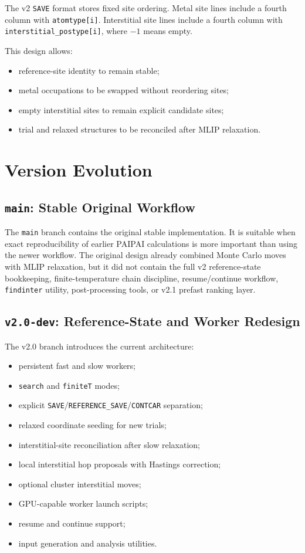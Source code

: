 \documentclass[11pt]{article}
\begin{document}
The v2 \texttt{SAVE} format stores fixed site ordering.
Metal site lines include a fourth column with \texttt{atomtype[i]}.
Interstitial site lines include a fourth column with \texttt{interstitial\_postype[i]}, where $-1$ means empty.

This design allows:

\begin{itemize}
  \item reference-site identity to remain stable;
  \item metal occupations to be swapped without reordering sites;
  \item empty interstitial sites to remain explicit candidate sites;
  \item trial and relaxed structures to be reconciled after MLIP relaxation.
\end{itemize}

\section{Version Evolution}

\subsection{\texttt{main}: Stable Original Workflow}

The \texttt{main} branch contains the original stable implementation.
It is suitable when exact reproducibility of earlier PAIPAI calculations is more important than using the newer workflow.
The original design already combined Monte Carlo moves with MLIP relaxation, but it did not contain the full v2 reference-state bookkeeping, finite-temperature chain discipline, resume/continue workflow, \texttt{findinter} utility, post-processing tools, or v2.1 prefast ranking layer.

\subsection{\texttt{v2.0-dev}: Reference-State and Worker Redesign}

The v2.0 branch introduces the current architecture:

\begin{itemize}
  \item persistent fast and slow workers;
  \item \texttt{search} and \texttt{finiteT} modes;
  \item explicit \texttt{SAVE}/\texttt{REFERENCE\_SAVE}/\texttt{CONTCAR} separation;
  \item relaxed coordinate seeding for new trials;
  \item interstitial-site reconciliation after slow relaxation;
  \item local interstitial hop proposals with Hastings correction;
  \item optional cluster interstitial moves;
  \item GPU-capable worker launch scripts;
  \item resume and continue support;
  \item input generation and analysis utilities.
\end{itemize}
\end{document}
